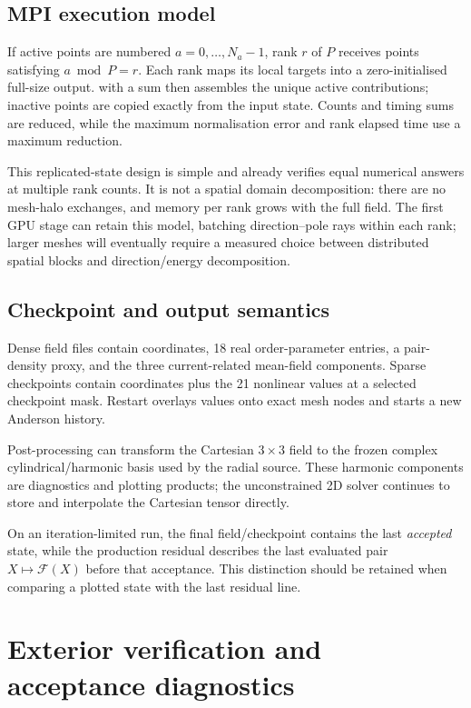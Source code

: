 \documentclass[11pt,a4paper]{article}
\newcommand{\Fmap}{\mathcal{F}}
\newcommand{\code}[1]{\texttt{\detokenize{#1}}}
\begin{document}
\subsection{MPI execution model}

If active points are numbered $a=0,\ldots,N_a-1$, rank $r$ of $P$ receives
points satisfying $a\bmod P=r$.  Each rank maps its local targets into a
zero-initialised full-size output.  \code{MPI_Allreduce} with a sum then
assembles the unique active contributions; inactive points are copied exactly
from the input state.  Counts and timing sums are reduced, while the maximum
normalisation error and rank elapsed time use a maximum reduction.

This replicated-state design is simple and already verifies equal numerical
answers at multiple rank counts.  It is not a spatial domain decomposition:
there are no mesh-halo exchanges, and memory per rank grows with the full
field.  The first GPU stage can retain this model, batching direction--pole
rays within each rank; larger meshes will eventually require a measured choice
between distributed spatial blocks and direction/energy decomposition.

\subsection{Checkpoint and output semantics}

Dense field files contain coordinates, 18 real order-parameter entries, a
pair-density proxy, and the three current-related mean-field components.
Sparse checkpoints contain coordinates plus the 21 nonlinear values at a
selected checkpoint mask.  Restart overlays values onto exact mesh nodes and
starts a new Anderson history.

Post-processing can transform the Cartesian $3\times3$ field to the frozen
complex cylindrical/harmonic basis used by the radial source.  These harmonic
components are diagnostics and plotting products; the unconstrained 2D solver
continues to store and interpolate the Cartesian tensor directly.

On an iteration-limited run, the final field/checkpoint contains the last
\emph{accepted} state, while the production residual describes the last
evaluated pair $X\mapsto\Fmap(X)$ before that acceptance.  This distinction
should be retained when comparing a plotted state with the last residual line.

\section{Exterior verification and acceptance diagnostics}
\end{document}
